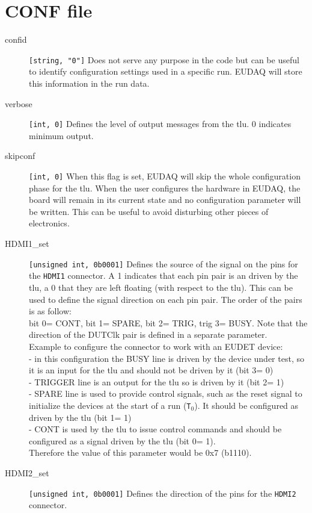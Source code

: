 \section{CONF file}
\begin{description}
  \item[confid] \verb|[string, "0"]| Does not serve any purpose in the code but can be useful to identify configuration settings used in a specific run. EUDAQ will store this information in the run data.
  \item[verbose] \verb|[int, 0]| Defines the level of output messages from the \gls{tlu}. 0 indicates minimum output.
  \item[skipconf] \verb|[int, 0]| When this flag is set, EUDAQ will skip the whole configuration phase for the \gls{tlu}. When the user configures the hardware in EUDAQ, the board will remain in its current state and no configuration parameter will be written. This can be useful to avoid disturbing other pieces of electronics.
  \item[HDMI1\_set] \verb|[unsigned int, 0b0001]| Defines the source of the signal on the pins for the \verb|HDMI1| connector. A 1 indicates that each pin pair is an driven by the \gls{tlu}, a 0 that they are left floating (with respect to the \gls{tlu}). This can be used to define the signal direction on each pin pair. The order of the pairs is as follow:\\
  bit 0= CONT, bit 1= SPARE, bit 2= TRIG, trig 3= BUSY. Note that the direction of the DUTClk pair is defined in a separate parameter.\\
  Example to configure the connector to work with an EUDET device:\\
  - in this configuration the BUSY line is driven by the device under test, so it is an input for the \gls{tlu} and should not be driven by it (bit 3= 0)\\
  - TRIGGER line is an output for the \gls{tlu} so is driven by it (bit 2= 1)\\
  - SPARE line is used to provide control signals, such as the reset signal to initialize the devices at the start of a run (\texttt{T$_0$}). It should be configured as driven by the \gls{tlu} (bit 1= 1)\\
  - CONT is used by the \gls{tlu} to issue control commands and should be configured as a signal driven by the \gls{tlu} (bit 0= 1).\\
  Therefore the value of this parameter would be 0x7 (b1110).
  \item[HDMI2\_set] \verb|[unsigned int, 0b0001]| Defines the direction of the pins for the \verb|HDMI2| connector.

\end{description}
